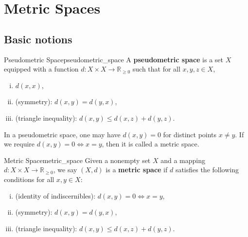 \documentclass{report}
\begin{document}
\section{Metric Spaces}
\subsection{Basic notions}

\begin{definition}{Pseudometric Space}{pseudometric_space}
	A \textbf{pseudometric space} is a set $X$ equipped with a function $d:X\times X\to \mathbb{R}_{\ge 0}$ such that for all $x,y,z\in X$,
	\begin{enumerate}[(i)]
		\item $d(x,x)$,
		\item (symmetry): $d(x,y)=d(y,x)$,
		\item (triangle inequality): $d(x,y)\le d(x,z)+d(y,z)$.
	\end{enumerate}
\end{definition}

In a pseudometric space, one may have $d(x,y)=0$ for distinct points $x\neq y$. If we require $d(x,y)=0\iff x=y$, then it is called a metric space.


\begin{definition}{Metric Space}{metric_space}
	Given a nonempty set $X$ and a mapping $d:X\times X\to \mathbb{R}_{\ge 0}$, we say $(X,d)$ is a \textbf{metric space} if $d$ satisfies the following conditions for all $x,y\in X$:
	\begin{enumerate}[(i)]
		\item (identity of indiscernibles): $d(x,y)=0\iff x=y$,
		\item (symmetry): $d(x,y)=d(y,x)$,
		\item (triangle inequality): $d(x,y)\le d(x,z)+d(y,z)$.
	\end{enumerate}
\end{definition}
\end{document}
